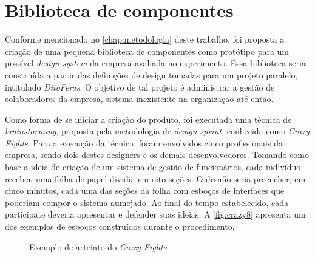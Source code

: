 
\chapter{Biblioteca de componentes}
\label{chap:bibComponentes}

Conforme mencionado no \autoref{chap:metodologia} deste trabalho, foi proposta a criação de uma pequena biblioteca de componentes como protótipo para um possível \textit{design system} da empresa avaliada no experimento. Essa biblioteca seria construída a partir das definições de design tomadas para um projeto paralelo, intitulado \textit{DitoFeras}. O objetivo de tal projeto é administrar a gestão de colaboradores da empresa, sistema inexistente na organização até então.

Como forma de se iniciar a criação do produto, foi executada uma técnica de \textit{brainstorming}, proposta pela metodologia de \textit{design sprint}, conhecida como \textit{Crazy Eights}. Para a execução da técnica, foram envolvidos cinco profissionais da empresa, sendo dois destes designers e os demais desenvolvedores. Tomando como base a ideia de criação de um sistema de gestão de funcionários, cada indivíduo recebeu uma folha de papel dividia em oito seções. O desafio seria preencher, em cinco minutos, cada uma das seções da folha com esboços de interfaces que poderiam compor o sistema aumejado. Ao final do tempo estabelecido, cada participate deveria apresentar e defender suas ideias. A \autoref{fig:crazy8} apresenta um dos exemplos de esboços construídos durante o procedimento.

\begin{figure}
  \caption{Exemplo de artefato do \textit{Crazy Eights}}
  \label{fig:crazy8}
\end{figure}

